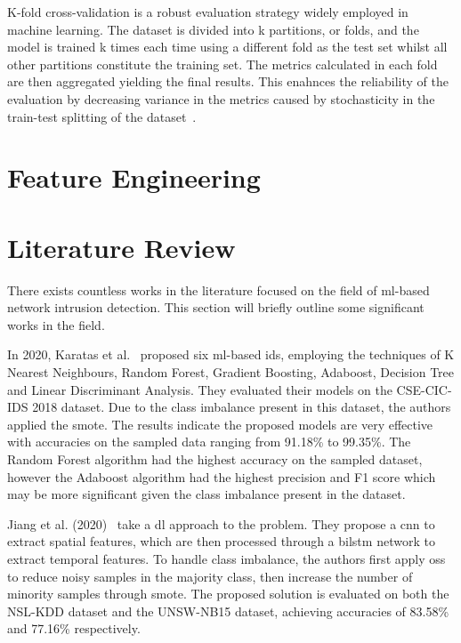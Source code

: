 K-fold cross-validation is a robust evaluation strategy widely employed in
machine learning. The dataset is divided into k partitions, or folds, and the
model is trained k times each time using a different fold as the test set
whilst all other partitions constitute the training set. The metrics calculated
in each fold are then aggregated yielding the final results. This enahnces the
reliability of the evaluation by decreasing variance in the metrics caused by
stochasticity in the train-test splitting of the dataset~\cite{kfoldcv}.

\section{Feature Engineering}%
\label{sec:feat_eng}

\section{Literature Review}%
\label{sec:literature}

There exists countless works in the literature focused on the field of
\gls{ml}-based network intrusion detection. This section will briefly outline
some significant works in the field.

In 2020, Karatas et al.~\cite{Karatas} proposed six \gls{ml}-based \gls{ids},
employing the techniques of K Nearest Neighbours, Random Forest, Gradient
Boosting, Adaboost, Decision Tree and Linear Discriminant Analysis. They
evaluated their models on the CSE-CIC-IDS 2018 dataset. Due to the class
imbalance present in this dataset, the authors applied the \gls{smote}. The
results indicate the proposed models are very effective with accuracies on the
sampled data ranging from 91.18\% to 99.35\%. The Random Forest algorithm had
the highest accuracy on the sampled dataset, however the Adaboost algorithm had
the highest precision and F1 score which may be more significant given the
class imbalance present in the dataset.

Jiang et al. (2020)~\cite{Jiang} take a \gls{dl} approach to the problem. They
propose a \gls{cnn} to extract spatial features, which are then processed
through a \gls{bilstm} network to extract temporal features. To handle class
imbalance, the authors first apply \gls{oss} to reduce noisy samples in the
majority class, then increase the number of minority samples through
\gls{smote}. The proposed solution is evaluated on both the NSL-KDD dataset and
the UNSW-NB15 dataset, achieving accuracies of 83.58\% and 77.16\%
respectively.

